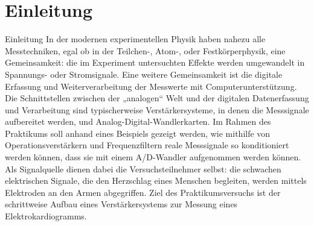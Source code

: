 \chapter{Einleitung}
Einleitung
In der modernen experimentellen Physik haben nahezu alle Messtechniken, egal ob in der Teilchen-, Atom-, oder Festkörperphysik, eine Gemeinsamkeit: die im Experiment untersuchten Effekte werden umgewandelt in Spannungs- oder Stromsignale. Eine weitere Gemeinsamkeit ist die digitale Erfassung und Weiterverarbeitung der Messwerte mit Computerunterstützung. Die Schnittstellen zwischen der „analogen“ Welt und der digitalen Datenerfassung und Verarbeitung sind typischerweise Verstärkersysteme, in denen die Messsignale aufbereitet werden, und Analog-Digital-Wandlerkarten. Im Rahmen des Praktikums soll anhand eines Beispiels gezeigt werden, wie mithilfe von Operationsverstärkern und Frequenzfiltern reale Messsignale so konditioniert werden können, dass sie mit einem A/D-Wandler aufgenommen werden können. Als Signalquelle dienen dabei die Versuchsteilnehmer selbst: die schwachen elektrischen Signale, die den Herzschlag eines Menschen begleiten, werden mittels Elektroden an den Armen abgegriffen. Ziel des Praktikumsversuchs ist der schrittweise Aufbau eines Verstärkersystems zur Messung eines Elektrokardiogramms.


